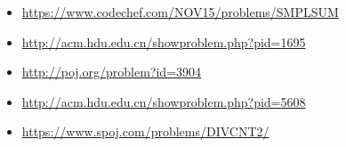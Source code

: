 \begin{itemize}
    \item \href{https://www.codechef.com/NOV15/problems/SMPLSUM}{https://www.codechef.com/NOV15/problems/SMPLSUM}

    \item \href{http://acm.hdu.edu.cn/showproblem.php?pid=1695}{http://acm.hdu.edu.cn/showproblem.php?pid=1695}

    \item \href{http://poj.org/problem?id=3904}{http://poj.org/problem?id=3904}

    \item \href{http://acm.hdu.edu.cn/showproblem.php?pid=5608}{http://acm.hdu.edu.cn/showproblem.php?pid=5608}

    \item \href{https://www.spoj.com/problems/DIVCNT2/}{https://www.spoj.com/problems/DIVCNT2/}
   
\end{itemize}


